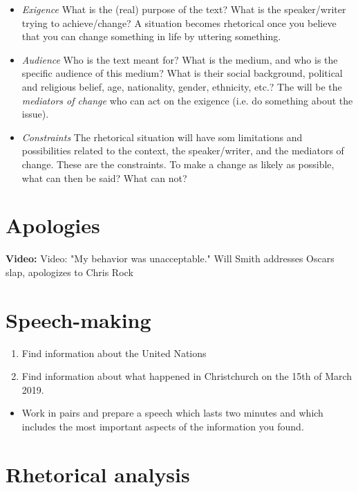 \documentclass[11pt,a4paper,oneside]{book}
\begin{document}
\begin{itemize}
\item \emph{Exigence} What is the (real) purpose of the text? What is the speaker/writer trying to achieve/change? A situation becomes rhetorical once you believe that you can change something in life by uttering something.
\item \emph{Audience} Who is the text meant for? What is the medium, and who is the specific audience of this medium? What is their social background, political and religious belief, age, nationality, gender, ethnicity, etc.? The will be the \emph{mediators of change} who can act on the exigence (i.e. do something about the issue).
\item \emph{Constraints} The rhetorical situation will have som limitations and possibilities related to the context, the speaker/writer, and the mediators of change. These are the constraints. To make a change as likely as possible, what can then be said? What can not?
\end{itemize}

\section*{Apologies}

\par\noindent\textbf{Video:} Video: "My behavior was unacceptable." Will Smith addresses Oscars slap, apologizes to Chris Rock\par\medskip

\section*{Speech-making}

\begin{enumerate}
\item Find information about the United Nations
\item Find information about what happened in Christchurch on the 15th of March 2019.
\end{enumerate}

\begin{itemize}
\item Work in pairs and prepare a speech which lasts two minutes and which includes the most important aspects of the information you found.
\end{itemize}

\section*{Rhetorical analysis}
\end{document}
